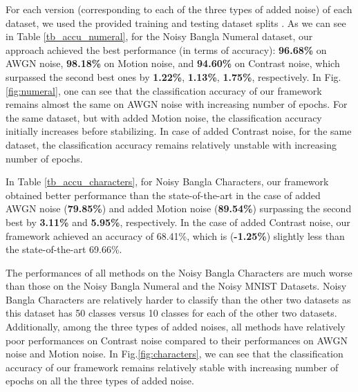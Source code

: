 \documentclass[runningheads]{llncs}
\begin{document}
For each version (corresponding to each of the three types of added noise) of each dataset, we used the provided training  and testing dataset  splits \cite{Karki18}.   As we can see in  Table \ref{tb_accu_numeral}, for  the Noisy Bangla Numeral dataset, our approach achieved the best performance (in terms of accuracy): \textbf{96.68\%} on AWGN noise, \textbf{98.18\%} on Motion noise, and \textbf{94.60\%} on Contrast noise, which surpassed the second best ones by \textbf{1.22\%}, \textbf{1.13\%}, \textbf{1.75\%}, respectively. In  Fig.\ref{fig:numeral}, one can see  that the classification accuracy of our framework remains almost the same on AWGN noise with increasing number of epochs. For the same dataset, but with added  Motion noise, the classification accuracy initially increases before stabilizing.  In case of added Contrast noise, for the same dataset, the classification accuracy remains relatively unstable  with increasing number of epochs. 




In Table \ref{tb_accu_characters}, for Noisy Bangla Characters, our framework obtained better performance than the state-of-the-art in the case of added AWGN noise (\textbf{79.85\%}) and added Motion noise (\textbf{89.54\%})  surpassing the second best by \textbf{3.11\%} and \textbf{5.95\%}, respectively. In the case of added Contrast noise, our framework achieved an accuracy of  68.41\%, which is (\textbf{-1.25\%}) slightly less than the state-of-the-art  69.66\%. 


The performances of all methods on the Noisy Bangla Characters are much worse than  those on  the Noisy Bangla Numeral and  the Noisy MNIST Datasets.  Noisy Bangla Characters are relatively harder to classify than the other two datasets as this dataset  has 50 classes versus 10 classes  for each  of the  other two  datasets. Additionally, among  the three types of added noises, all methods have relatively poor performances on Contrast noise compared to their performances on AWGN noise and Motion noise. In  Fig.\ref{fig:characters}, we can see that the classification accuracy of our framework remains relatively stable with increasing number of epochs on all the three  types of added noise. 
\end{document}
